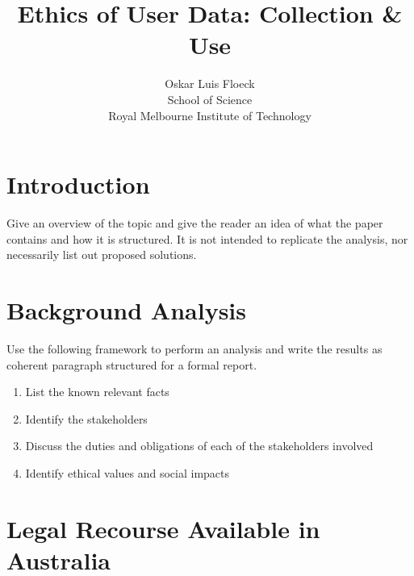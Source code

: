 \documentclass[12pt,a4paper]{article}
\begin{document}
\title{Ethics of User Data: Collection \& Use}

\author{
Oskar Luis Floeck\\
School of Science\\
Royal Melbourne Institute of Technology}

\maketitle

\tableofcontents


\section{Introduction}

Give an overview of the topic and give the reader an idea of what the paper contains and how it is structured. It is not intended to replicate the analysis, nor necessarily list out proposed solutions.


\section{Background Analysis}

Use the following framework to perform an analysis and write the results as coherent paragraph structured for a formal report.

\begin{enumerate}
	\item List the known relevant facts
	\item Identify the stakeholders
	\item Discuss the duties and obligations of each of the stakeholders involved
	\item Identify ethical values and social impacts
\end{enumerate}


\section{Legal Recourse Available in Australia}
\end{document}
